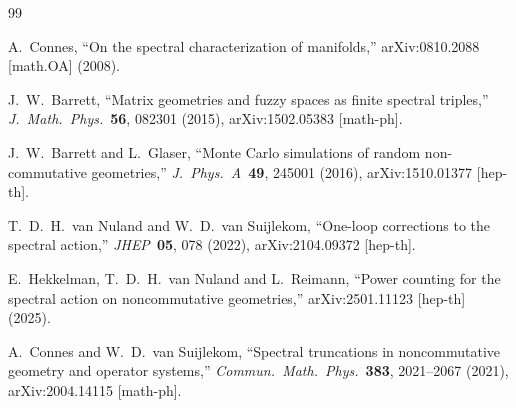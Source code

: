 \documentclass[12pt,a4paper]{article}
\theoremstyle{definition}
\theoremstyle{remark}
\begin{document}
\begin{thebibliography}{99}

A.~Connes,
``On the spectral characterization of manifolds,''
arXiv:0810.2088 [math.OA] (2008).

J.~W.~Barrett,
``Matrix geometries and fuzzy spaces as finite spectral triples,''
\textit{J.\ Math.\ Phys.}\ \textbf{56}, 082301 (2015),
arXiv:1502.05383 [math-ph].

J.~W.~Barrett and L.~Glaser,
``Monte Carlo simulations of random non-commutative geometries,''
\textit{J.\ Phys.\ A}\ \textbf{49}, 245001 (2016),
arXiv:1510.01377 [hep-th].

T.~D.~H.~van Nuland and W.~D.~van Suijlekom,
``One-loop corrections to the spectral action,''
\textit{JHEP}\ \textbf{05}, 078 (2022),
arXiv:2104.09372 [hep-th].

E.~Hekkelman, T.~D.~H.~van Nuland and L.~Reimann,
``Power counting for the spectral action on noncommutative geometries,''
arXiv:2501.11123 [hep-th] (2025).

A.~Connes and W.~D.~van Suijlekom,
``Spectral truncations in noncommutative geometry and operator systems,''
\textit{Commun.\ Math.\ Phys.}\ \textbf{383}, 2021--2067 (2021),
arXiv:2004.14115 [math-ph].

\end{thebibliography}
\end{document}
